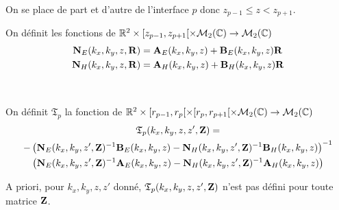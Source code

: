     On se place de part et d'autre de l'interface \(p\) donc \(z_{p-1} \le z < z_{p+1} \).

    \begin{defn}
      \label{def:plan:matrices_NE-NH}
      On définit les fonctions de \(\mathbb R^2 \times [z_{p-1},z_{p+1}[ \times \mathcal{M}_{2}(\mathbb C) \rightarrow \mathcal{M}_{2}(\mathbb C)\)
      \begin{align*}
        \mathbf{N}_{E}(k_x,k_y,z,\mathbf{R}) &= \mathbf{A}_{E}(k_x,k_y,z) + \mathbf{B}_{E}(k_x,k_y,z)\mathbf{R}
        \\
        \mathbf{N}_{H}(k_x,k_y,z,\mathbf{R}) &= \mathbf{A}_{H}(k_x,k_y,z) + \mathbf{B}_{H}(k_x,k_y,z)\mathbf{R}
      \end{align*}
    \end{defn}

    \begin{defn}%
      \label{def:plan:transfert:reflexion}{}~

      On définit \(\mathfrak{T}_p\) la fonction de \(\mathbb R^2 \times [r_{p-1}, r_p[\times[r_p, r_{p+1}[\times\mathcal{M}_2(\mathbb C)\rightarrow \mathcal{M}_{2}(\mathbb C)\)
      \begin{multline*}
        \mathfrak{T}_p(k_x,k_y,z,z',\mathbf{Z}) = \\
          -\left(\mathbf{N}_{E}(k_x,k_y,z',\mathbf{Z})^{-1}\mathbf{B}_{E}(k_x,k_y,z) - \mathbf{N}_{H}(k_x,k_y,z',\mathbf{Z})^{-1}\mathbf{B}_{H}(k_x,k_y,z)\right)^{-1}
          \\
          \left(\mathbf{N}_{E}(k_x,k_y,z',\mathbf{Z})^{-1}\mathbf{A}_{E}(k_x,k_y,z) - \mathbf{N}_{H}(k_x,k_y,z',\mathbf{Z})^{-1}\mathbf{A}_{H}(k_x,k_y,z)\right)
      \end{multline*}
    \end{defn}
    A priori, pour \(k_x,k_y,z,z'\) donné, \(\mathfrak{T}_p(k_x,k_y,z,z',\mathbf{Z})\) n'est pas défini pour toute matrice \(\mathbf{Z}\).

